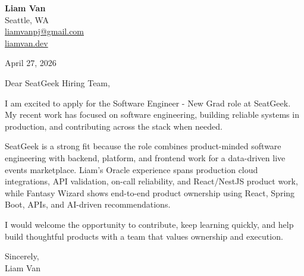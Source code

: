 \documentclass[letterpaper,11pt]{article}
\begin{document}
\begin{flushleft}
\textbf{\Large Liam Van} \\
Seattle, WA \\
\href{mailto:liamvanpj@gmail.com}{liamvanpj@gmail.com} \\
\href{https://liamvan.dev}{liamvan.dev}
\end{flushleft}

April 27, 2026

\noindent Dear SeatGeek Hiring Team,

\noindent I am excited to apply for the Software Engineer - New Grad role at SeatGeek. My recent work has focused on software engineering, building reliable systems in production, and contributing across the stack when needed.

\noindent SeatGeek is a strong fit because the role combines product-minded software engineering with backend, platform, and frontend work for a data-driven live events marketplace. Liam's Oracle experience spans production cloud integrations, API validation, on-call reliability, and React/NestJS product work, while Fantasy Wizard shows end-to-end product ownership using React, Spring Boot, APIs, and AI-driven recommendations.

\noindent I would welcome the opportunity to contribute, keep learning quickly, and help build thoughtful products with a team that values ownership and execution.

\noindent Sincerely, \\
Liam Van
\end{document}
